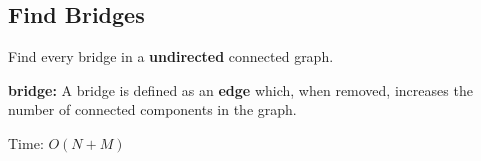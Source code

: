 \subsection{Find Bridges}

Find every bridge in a \textbf{undirected} connected graph.

\textbf{bridge: }  A bridge is defined as an \textbf{edge} which, when removed, increases the number of connected components in the graph. 


Time: $O(N+M)$

